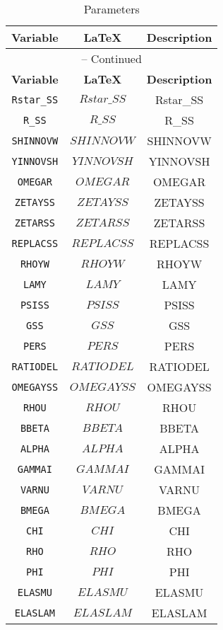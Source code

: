 \begin{center}
\begin{longtable}{ccc}
\caption{Parameters}\\%
\hline%
\multicolumn{1}{c}{\textbf{Variable}} &
\multicolumn{1}{c}{\textbf{\LaTeX}} &
\multicolumn{1}{c}{\textbf{Description}}\\%
\hline\hline%
\endfirsthead
\multicolumn{3}{c}{{\tablename} \thetable{} -- Continued}\\%
\hline%
\multicolumn{1}{c}{\textbf{Variable}} &
\multicolumn{1}{c}{\textbf{\LaTeX}} &
\multicolumn{1}{c}{\textbf{Description}}\\%
\hline\hline%
\endhead
\texttt{Rstar\_SS} & $Rstar\_SS$ & Rstar\_SS\\
\texttt{R\_SS} & $R\_SS$ & R\_SS\\
\texttt{SHINNOVW} & $SHINNOVW$ & SHINNOVW\\
\texttt{YINNOVSH} & $YINNOVSH$ & YINNOVSH\\
\texttt{OMEGAR} & $OMEGAR$ & OMEGAR\\
\texttt{ZETAYSS} & $ZETAYSS$ & ZETAYSS\\
\texttt{ZETARSS} & $ZETARSS$ & ZETARSS\\
\texttt{REPLACSS} & $REPLACSS$ & REPLACSS\\
\texttt{RHOYW} & $RHOYW$ & RHOYW\\
\texttt{LAMY} & $LAMY$ & LAMY\\
\texttt{PSISS} & $PSISS$ & PSISS\\
\texttt{GSS} & $GSS$ & GSS\\
\texttt{PERS} & $PERS$ & PERS\\
\texttt{RATIODEL} & $RATIODEL$ & RATIODEL\\
\texttt{OMEGAYSS} & $OMEGAYSS$ & OMEGAYSS\\
\texttt{RHOU} & $RHOU$ & RHOU\\
\texttt{BBETA} & $BBETA$ & BBETA\\
\texttt{ALPHA} & $ALPHA$ & ALPHA\\
\texttt{GAMMAI} & $GAMMAI$ & GAMMAI\\
\texttt{VARNU} & $VARNU$ & VARNU\\
\texttt{BMEGA} & $BMEGA$ & BMEGA\\
\texttt{CHI} & $CHI$ & CHI\\
\texttt{RHO} & $RHO$ & RHO\\
\texttt{PHI} & $PHI$ & PHI\\
\texttt{ELASMU} & $ELASMU$ & ELASMU\\
\texttt{ELASLAM} & $ELASLAM$ & ELASLAM\\

\end{longtable}
\end{center}
